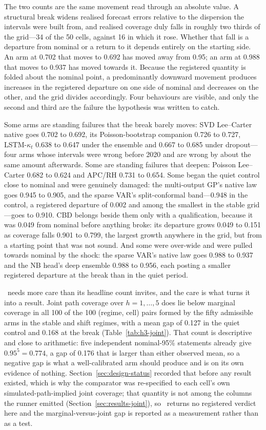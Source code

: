 The two counts are the same movement read through an absolute value. A
structural break widens realised forecast errors relative to the
dispersion the intervals were built from, and realised coverage duly
falls in roughly two thirds of the grid---34 of the 50 cells, against 16
in which it rose. Whether that fall is a departure from nominal or a
return to it depends entirely on the starting side. An arm at 0.702 that
moves to 0.692 has moved away from 0.95; an arm at 0.988 that moves to
0.937 has moved towards it. Because the registered quantity is folded
about the nominal point, a predominantly downward movement produces
increases in the registered departure on one side of nominal and
decreases on the other, and the grid divides accordingly. Four
behaviours are visible, and only the second and third are the failure the
hypothesis was written to catch.

Some arms are standing failures that the break barely moves: SVD
Lee--Carter native goes 0.702 to 0.692, its Poisson-bootstrap companion
0.726 to 0.727, LSTM-$\kappa_t$ 0.638 to 0.647 under the ensemble and
0.667 to 0.685 under dropout---four arms whose intervals were wrong
before 2020 and are wrong by about the same amount afterwards. Some are
standing failures that deepen: Poisson Lee--Carter 0.682 to 0.624 and
APC/RH 0.731 to 0.654. Some began the quiet control close to nominal and
were genuinely damaged: the multi-output GP's native law goes 0.945 to
0.905, and the sparse VAR's split-conformal band---0.948 in the control,
a registered departure of 0.002 and among the smallest in the stable
grid---goes to 0.910. CBD belongs beside them only with a qualification,
because it was 0.049 from nominal before anything broke: its departure
grows 0.049 to 0.151 as coverage falls 0.901 to 0.799, the largest growth
anywhere in the grid, but from a starting point that was not sound. And
some were over-wide and were pulled towards nominal by the shock: the
sparse VAR's native law goes 0.988 to 0.937 and the NB head's deep
ensemble 0.988 to 0.956, each posting a smaller registered departure at
the break than in the quiet period.

\Hthree\ needs more care than its headline count invites, and the care
is what turns it into a result. Joint path coverage over $h=1,\dots,5$
does lie below marginal coverage in all 100 of the 100 (regime, cell)
pairs formed by the fifty admissible arms in the stable and shift
regimes, with a mean gap of 0.127 in the quiet control and 0.168 at the
break (Table~\ref{tab:h3-joint}). That count is descriptive and close to
arithmetic: five independent nominal-95\% statements already give
$0.95^5=0.774$, a gap of 0.176 that is larger than either observed mean,
so a negative gap is what a well-calibrated arm should produce and is on
its own evidence of nothing. Section~\ref{sec:design-status} recorded
that before any result existed, which is why the comparator was
re-specified to each cell's own simulated-path-implied joint coverage;
that quantity is not among the columns the runner emitted
(Section~\ref{sec:results-joint}), so \Hthree\ returns no registered
verdict here and the marginal-versus-joint gap is reported as a
measurement rather than as a test.

